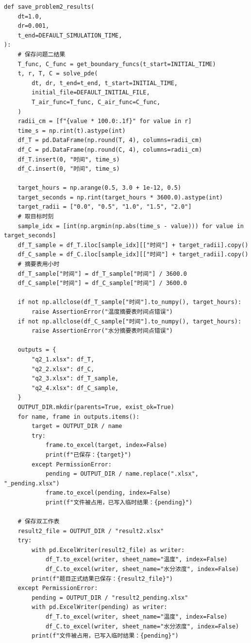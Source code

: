 \documentclass[withoutpreface,bwprint]{cumcm_thesis}
\begin{document}
\begin{appendices}
\begin{lstlisting}
def save_problem2_results(
    dt=1.0,
    dr=0.001,
    t_end=DEFAULT_SIMULATION_TIME,
):
    # 保存问题二结果
    T_func, C_func = get_boundary_funcs(t_start=INITIAL_TIME)
    t, r, T, C = solve_pde(
        dt, dr, t_end=t_end, t_start=INITIAL_TIME,
        initial_file=DEFAULT_INITIAL_FILE,
        T_air_func=T_func, C_air_func=C_func,
    )
    radii_cm = [f"{value * 100.0:.1f}" for value in r]
    time_s = np.rint(t).astype(int)
    df_T = pd.DataFrame(np.round(T, 4), columns=radii_cm)
    df_C = pd.DataFrame(np.round(C, 4), columns=radii_cm)
    df_T.insert(0, "时间", time_s)
    df_C.insert(0, "时间", time_s)

    target_hours = np.arange(0.5, 3.0 + 1e-12, 0.5)
    target_seconds = np.rint(target_hours * 3600.0).astype(int)
    target_radii = ["0.0", "0.5", "1.0", "1.5", "2.0"]
    # 取目标时刻
    sample_idx = [int(np.argmin(np.abs(time_s - value))) for value in target_seconds]
    df_T_sample = df_T.iloc[sample_idx][["时间"] + target_radii].copy()
    df_C_sample = df_C.iloc[sample_idx][["时间"] + target_radii].copy()
    # 摘要表用小时
    df_T_sample["时间"] = df_T_sample["时间"] / 3600.0
    df_C_sample["时间"] = df_C_sample["时间"] / 3600.0

    if not np.allclose(df_T_sample["时间"].to_numpy(), target_hours):
        raise AssertionError("温度摘要表时间点错误")
    if not np.allclose(df_C_sample["时间"].to_numpy(), target_hours):
        raise AssertionError("水分摘要表时间点错误")

    outputs = {
        "q2_1.xlsx": df_T,
        "q2_2.xlsx": df_C,
        "q2_3.xlsx": df_T_sample,
        "q2_4.xlsx": df_C_sample,
    }
    OUTPUT_DIR.mkdir(parents=True, exist_ok=True)
    for name, frame in outputs.items():
        target = OUTPUT_DIR / name
        try:
            frame.to_excel(target, index=False)
            print(f"已保存：{target}")
        except PermissionError:
            pending = OUTPUT_DIR / name.replace(".xlsx", "_pending.xlsx")
            frame.to_excel(pending, index=False)
            print(f"文件被占用，已写入临时结果：{pending}")

    # 保存双工作表
    result2_file = OUTPUT_DIR / "result2.xlsx"
    try:
        with pd.ExcelWriter(result2_file) as writer:
            df_T.to_excel(writer, sheet_name="温度", index=False)
            df_C.to_excel(writer, sheet_name="水分浓度", index=False)
        print(f"题目正式结果已保存：{result2_file}")
    except PermissionError:
        pending = OUTPUT_DIR / "result2_pending.xlsx"
        with pd.ExcelWriter(pending) as writer:
            df_T.to_excel(writer, sheet_name="温度", index=False)
            df_C.to_excel(writer, sheet_name="水分浓度", index=False)
        print(f"文件被占用，已写入临时结果：{pending}")


\end{lstlisting}
\end{appendices}
\end{document}
